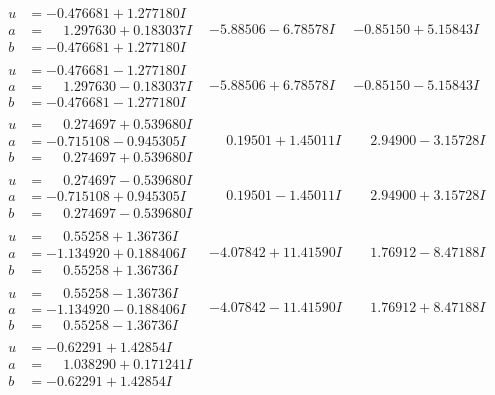 \documentclass[1p]{elsarticle_modified}
\theoremstyle{definition}
\begin{document}
$$\begin{array}{c|c|c}
\begin{aligned}
u &= -0.476681 + 1.277180 I \\
a &= \phantom{-}1.297630 + 0.183037 I \\
b &= -0.476681 + 1.277180 I\end{aligned}
 & -5.88506 - 6.78578 I & -0.85150 + 5.15843 I \\ \hline\begin{aligned}
u &= -0.476681 - 1.277180 I \\
a &= \phantom{-}1.297630 - 0.183037 I \\
b &= -0.476681 - 1.277180 I\end{aligned}
 & -5.88506 + 6.78578 I & -0.85150 - 5.15843 I \\ \hline\begin{aligned}
u &= \phantom{-}0.274697 + 0.539680 I \\
a &= -0.715108 - 0.945305 I \\
b &= \phantom{-}0.274697 + 0.539680 I\end{aligned}
 & \phantom{-}0.19501 + 1.45011 I & \phantom{-}2.94900 - 3.15728 I \\ \hline\begin{aligned}
u &= \phantom{-}0.274697 - 0.539680 I \\
a &= -0.715108 + 0.945305 I \\
b &= \phantom{-}0.274697 - 0.539680 I\end{aligned}
 & \phantom{-}0.19501 - 1.45011 I & \phantom{-}2.94900 + 3.15728 I \\ \hline\begin{aligned}
u &= \phantom{-}0.55258 + 1.36736 I \\
a &= -1.134920 + 0.188406 I \\
b &= \phantom{-}0.55258 + 1.36736 I\end{aligned}
 & -4.07842 + 11.41590 I & \phantom{-}1.76912 - 8.47188 I \\ \hline\begin{aligned}
u &= \phantom{-}0.55258 - 1.36736 I \\
a &= -1.134920 - 0.188406 I \\
b &= \phantom{-}0.55258 - 1.36736 I\end{aligned}
 & -4.07842 - 11.41590 I & \phantom{-}1.76912 + 8.47188 I \\ \hline\begin{aligned}
u &= -0.62291 + 1.42854 I \\
a &= \phantom{-}1.038290 + 0.171241 I \\
b &= -0.62291 + 1.42854 I\end{aligned}

\end{array}$$
\end{document}
